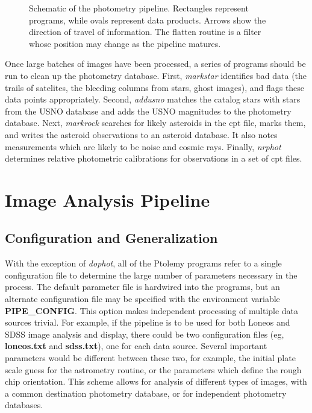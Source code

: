 \documentclass{article}
\newcommand\pr{\em}                   %
\newcommand\ff{\bf}                   %
\newcommand\ty{\sc}                   %
\begin{document}
\begin{figure}
\caption{\label{pipeline} \small
  Schematic of the photometry pipeline.  Rectangles represent
  programs, while ovals represent data products.  Arrows show the
  direction of travel of information.  The flatten routine is a filter
  whose position may change as the pipeline matures.  }
\end{figure}

Once large batches of images have been processed, a series of programs
should be run to clean up the photometry database.  First, {\pr
markstar} identifies bad data (the trails of satelites, the bleeding
columns from stars, ghost images), and flags these data points
appropriately.  Second, {\pr addusno} matches the catalog stars with
stars from the USNO database and adds the USNO magnitudes to the
photometry database.  Next, {\pr markrock} searches for likely
asteroids in the {\ty cpt} file, marks them, and writes the asteroid
observations to an asteroid database.  It also notes measurements
which are likely to be noise and cosmic rays.  Finally, {\pr nrphot}
determines relative photometric calibrations for observations in a set
of {\ty cpt} files.

\section{Image Analysis Pipeline}
\label{parallel}

\subsection{Configuration and Generalization}
With the exception of {\pr dophot}, all of the Ptolemy programs refer
to a single configuration file to determine the large number of
parameters necessary in the process.  The default parameter file is
hardwired into the programs, but an alternate configuration file may
be specified with the environment variable {\ff PIPE\_CONFIG}.  This
option makes independent processing of multiple data sources trivial.
For example, if the pipeline is to be used for both Loneos and SDSS
image analysis and display, there could be two configuration files
(eg, {\ff loneos.txt} and {\ff sdss.txt}), one for each data source.
Several important parameters would be different between these two, for
example, the initial plate scale guess for the astrometry routine, or
the parameters which define the rough chip orientation.  This scheme
allows for analysis of different types of images, with a common
destination photometry database, or for independent photometry
databases.
\end{document}
